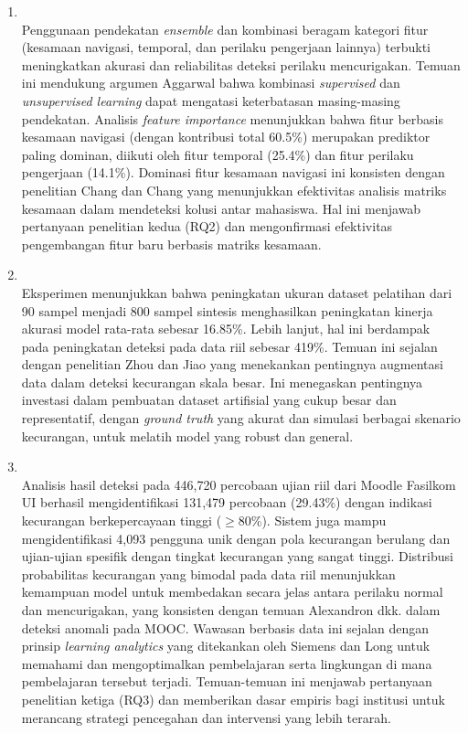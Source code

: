 \begin{enumerate}
    \item {} \\
    Penggunaan pendekatan \textit{ensemble} dan kombinasi beragam kategori fitur (kesamaan navigasi, temporal, dan perilaku pengerjaan lainnya) terbukti meningkatkan akurasi dan reliabilitas deteksi perilaku mencurigakan. Temuan ini mendukung argumen Aggarwal \cite{Aggarwal2017} bahwa kombinasi \textit{supervised} dan \textit{unsupervised learning} dapat mengatasi keterbatasan masing-masing pendekatan. Analisis \textit{feature importance} menunjukkan bahwa fitur berbasis kesamaan navigasi (dengan kontribusi total 60.5\%) merupakan prediktor paling dominan, diikuti oleh fitur temporal (25.4\%) dan fitur perilaku pengerjaan (14.1\%). Dominasi fitur kesamaan navigasi ini konsisten dengan penelitian Chang dan Chang \cite{Chang2023} yang menunjukkan efektivitas analisis matriks kesamaan dalam mendeteksi kolusi antar mahasiswa. Hal ini menjawab pertanyaan penelitian kedua (RQ2) dan mengonfirmasi efektivitas pengembangan fitur baru berbasis matriks kesamaan.

    \item {} \\
    Eksperimen menunjukkan bahwa peningkatan ukuran dataset pelatihan dari 90 sampel menjadi 800 sampel sintesis menghasilkan peningkatan kinerja akurasi model rata-rata sebesar 16.85\%. Lebih lanjut, hal ini berdampak pada peningkatan deteksi pada data riil sebesar 419\%. Temuan ini sejalan dengan penelitian Zhou dan Jiao \cite{Zhou2022} yang menekankan pentingnya augmentasi data dalam deteksi kecurangan skala besar. Ini menegaskan pentingnya investasi dalam pembuatan dataset artifisial yang cukup besar dan representatif, dengan \textit{ground truth} yang akurat dan simulasi berbagai skenario kecurangan, untuk melatih model yang robust dan general.

    \item {} \\
    Analisis hasil deteksi pada 446,720 percobaan ujian riil dari Moodle Fasilkom UI berhasil mengidentifikasi 131,479 percobaan (29.43\%) dengan indikasi kecurangan berkepercayaan tinggi ($\ge$80\%). Sistem juga mampu mengidentifikasi 4,093 pengguna unik dengan pola kecurangan berulang dan ujian-ujian spesifik dengan tingkat kecurangan yang sangat tinggi. Distribusi probabilitas kecurangan yang bimodal pada data riil menunjukkan kemampuan model untuk membedakan secara jelas antara perilaku normal dan mencurigakan, yang konsisten dengan temuan Alexandron dkk. \cite{Alexandron2019} dalam deteksi anomali pada MOOC. Wawasan berbasis data ini sejalan dengan prinsip \textit{learning analytics} yang ditekankan oleh Siemens dan Long \cite{Siemens2011} untuk memahami dan mengoptimalkan pembelajaran serta lingkungan di mana pembelajaran tersebut terjadi. Temuan-temuan ini menjawab pertanyaan penelitian ketiga (RQ3) dan memberikan dasar empiris bagi institusi untuk merancang strategi pencegahan dan intervensi yang lebih terarah.


\end{enumerate}
